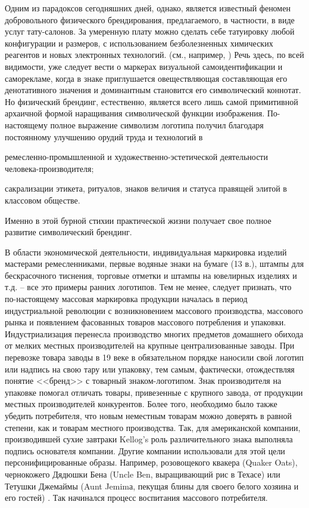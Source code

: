 Одним из парадоксов сегодняшних дней, однако, является известный феномен
добровольного физического брендирования, предлагаемого, в частности, в виде
услуг тату-салонов. За умеренную плату можно сделать себе татуировку любой
конфигурации и размеров, с использованием безболезненных химических реагентов
и новых электронных технологий. (см., например, \autocite{digitaltattoo}\autocite{tedtattoo})
Речь здесь, по всей видимости, уже следует вести о маркерах визуальной
самоидентификации и саморекламе, когда в знаке приглушается овеществляющая
составляющая его денотативного значения и доминантным становится его символический
коннотат. Но физический брендинг, естественно, является всего лишь самой примитивной
архаичной формой наращивания символической функции изображения. По-настоящему
полное выражение символизм логотипа получил благодаря постоянному улучшению
орудий труда и технологий в
\begin{enumerate*}[label=\asbuk*)]
    \item ремесленно-промышленной и художественно-эстетической деятельности человека-производителя;
    \item сакрализации этикета, ритуалов, знаков величия и статуса правящей элитой в
    классовом обществе.
\end{enumerate*}
Именно в этой бурной стихии практической жизни получает свое полное
развитие символический брендинг.

В области экономической деятельности, индивидуальная маркировка изделий мастерами
ремесленниками, первые водяные знаки на бумаге (13 в.), штампы для бескрасочного
тиснения, торговые отметки и штампы на ювелирных изделиях и т.д. -- все это примеры
ранних логотипов. Тем не менее, следует признать, что по-настоящему массовая маркировка
продукции началась в период индустриальной революции с возникновением массового производства,
массового рынка и появлением фасованных товаров массового потребления и упаковки.
Индустриализация перенесла производство многих предметов домашнего обихода от
мелких местных производителей на крупные централизованные заводы. При перевозке
товара заводы в 19 веке в обязательном порядке наносили свой логотип или надпись на
свою тару или упаковку, тем самым, фактически,  отождествляя понятие <<бренд>>
с  товарный знаком-логотипом.  Знак производителя на упаковке помогал отличать
товары, привезенные с крупного завода, от продукции местных производителей конкурентов.
Более того, необходимо было также убедить потребителя, что новым неместным товарам
можно доверять в равной степени, как  и товарам местного производства. Так, для
американской компании, производившей сухие завтраки Kellog’s  роль различительного
знака выполняла подпись основателя компании\autocite[][8]{evami2009}. Другие компании использовали
для этой цели персонифицированные образы. Например, розовощекого квакера (Quaker Oats),
чернокожего Дядюшки Бена (Uncle Ben, выращивающий рис в Техасе) или
Тетушки Джемаймы (Aunt Jemimа, пекущая блины для своего белого хозяина и его гостей) \autocite[][8]{evami2009}.
Так начинался процесс воспитания массового потребителя.

